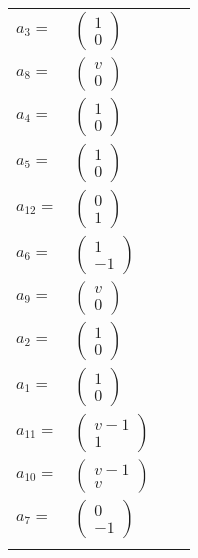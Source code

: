 \documentclass[1p]{elsarticle_modified}
\theoremstyle{definition}
\begin{document}
\begin{tabular}{m{7pt} m{180pt} m{7pt} m{180pt} }
\flushright $a_{3}=$&$\begin{pmatrix}1\\0\end{pmatrix}$ \\
\flushright $a_{8}=$&$\begin{pmatrix}v\\0\end{pmatrix}$ \\
\flushright $a_{4}=$&$\begin{pmatrix}1\\0\end{pmatrix}$ \\
\flushright $a_{5}=$&$\begin{pmatrix}1\\0\end{pmatrix}$ \\
\flushright $a_{12}=$&$\begin{pmatrix}0\\1\end{pmatrix}$ \\
\flushright $a_{6}=$&$\begin{pmatrix}1\\-1\end{pmatrix}$ \\
\flushright $a_{9}=$&$\begin{pmatrix}v\\0\end{pmatrix}$ \\
\flushright $a_{2}=$&$\begin{pmatrix}1\\0\end{pmatrix}$ \\
\flushright $a_{1}=$&$\begin{pmatrix}1\\0\end{pmatrix}$ \\
\flushright $a_{11}=$&$\begin{pmatrix}v-1\\1\end{pmatrix}$ \\
\flushright $a_{10}=$&$\begin{pmatrix}v-1\\v\end{pmatrix}$ \\
\flushright $a_{7}=$&$\begin{pmatrix}0\\-1\end{pmatrix}$\\&\end{tabular}
\end{document}
